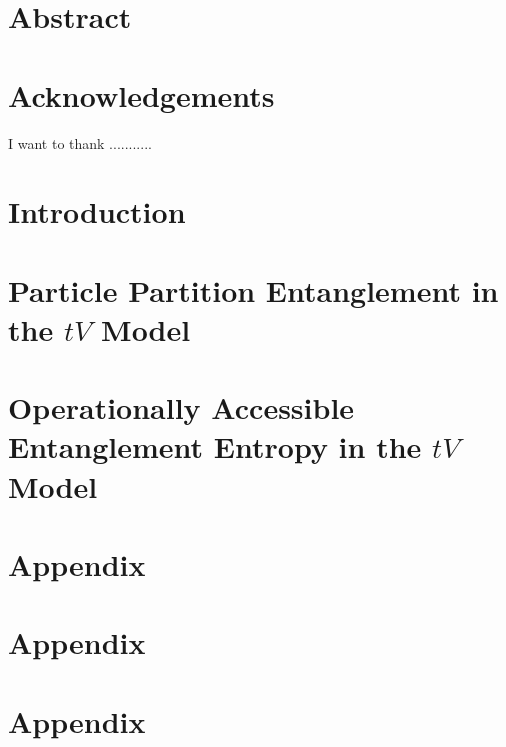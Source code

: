 \documentclass[12pt, two sided]{report}
\begin{document}



\chapter*{Abstract}


\chapter*{Acknowledgements}
I want to thank ...........

\tableofcontents

\chapter{Introduction}


\chapter{Particle Partition Entanglement in the $tV$ Model}


\chapter{Operationally Accessible Entanglement Entropy in the $tV$ Model}


\appendix
\chapter{Appendix}


\chapter{Appendix}


\chapter{Appendix}


{} 

\end{document}
